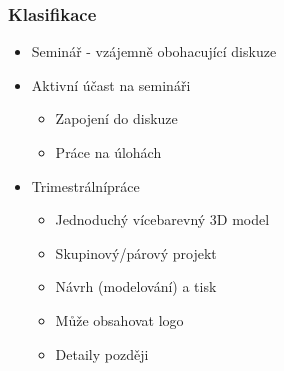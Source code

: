 \begin{frame}
    \frametitle{Klasifikace}

    \begin{itemize}
        \item Seminář - vzájemně obohacující diskuze
        \item Aktivní účast na semináři
        \begin{itemize}
            \item Zapojení do diskuze
            \item Práce na úlohách
        \end{itemize}
        \item Trimestrální\footnotemark práce
        \begin{itemize}
            \item Jednoduchý vícebarevný 3D model
            \item Skupinový/párový projekt
            \item Návrh (modelování) a tisk
            \item Může obsahovat logo
            \item Detaily později
        \end{itemize}
    \end{itemize}


\end{frame}